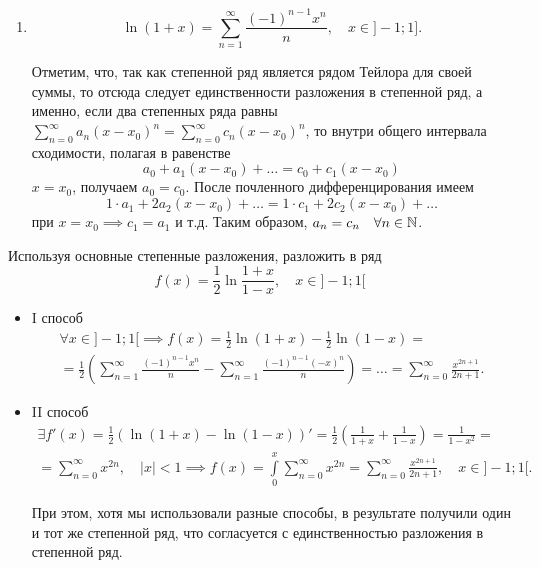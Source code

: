 \documentclass[../../main.tex]{subfiles}
\begin{document}
\begin{enumerate}
        \item \[\ln(1 + x) = \sum\limits_{n = 1}^{\infty}\frac{(-1)^{n - 1}x^n}
        {n}, \quad x \in ]-1; 1].\]
        
        Отметим, что, так как степенной ряд является рядом Тейлора для своей 
        суммы, то отсюда следует единственности разложения в степенной ряд, а 
        именно, если два степенных ряда равны $\sum\limits_{n = 0}^{\infty} 
        a_n(x - x_0)^n = \sum\limits_{n = 0}^{\infty} c_n(x-x_0)^n$, то внутри 
        общего интервала сходимости, полагая в равенстве
        \[ a_0 + a_1(x - x_0) + \ldots = c_0 + c_1(x - x_0) \]
        $x = x_0$, получаем $a_0 = c_0$. После почленного дифференцирования
        имеем\[1 \cdot a_1 + 2a_2(x - x_0) + \ldots = 
        1 \cdot c_1 + 2c_2(x - x_0) + \ldots \]
        при $x = x_0 \implies c_1 = a_1$ и т.д. Таким образом, 
        $a_n = c_n \quad \forall n \in \mathbb{N}$. 
	\end{enumerate}
	
    \begin{example}
        Используя основные степенные разложения, разложить в ряд
        \[f(x) = \frac12\ln\frac{1+x}{1-x},\quad x \in ]-1; 1[ \]
        \begin{itemize}
            \item I способ
            \begin{multline*}
                \forall x \in ]-1; 1[ \implies f(x) = \frac12 \ln(1+x) - \frac12 
                \ln(1-x) = \\ = \frac12 \left(\sum\limits_{n = 1}^{\infty} 
                \frac{(-1)^{n-1}x^n}{n} - \sum\limits_{n = 1}^{\infty} 
                \frac{(-1)^{n - 1}(-x)^n}{n}\right) = \ldots = 
                \sum\limits_{n = 0}^{\infty}
                \frac{x^{2n+1}}{2n+1}.
            \end{multline*}
            
            \item II способ
            \begin{multline*}
                \exists f'(x) = \frac12 (\ln(1+x) - \ln(1-x))' = \frac12 
                \left(\frac{1}{1+x} + \frac{1}{1-x} \right) = \frac{1}{1-x^2}
                = \\ = \sum\limits_{n = 0}^{\infty} x^{2n}, \quad |x| < 1 
                \implies f(x) = \int\limits_{0}^{x} 
                \sum\limits_{n = 0}^{\infty} x^{2n} = 
                \sum\limits_{n = 0}^{\infty} \frac{x^{2n + 1}}{2n + 1}, 
                \quad x \in ]-1;1[.
            \end{multline*}
            
            При этом, хотя мы использовали разные способы, в результате 
            получили один и тот же степенной ряд, что согласуется с 
            единственностью разложения в степенной ряд.
        \end{itemize}
    \end{example}
\end{document}
